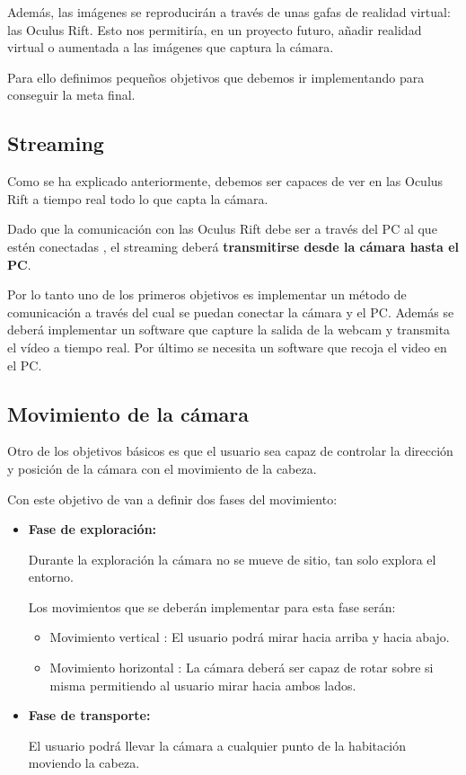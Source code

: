 \documentclass[twoside, 12pt]{epstfg}
\begin{document}
Además, las imágenes se reproducirán a través de unas gafas de realidad virtual: las Oculus Rift. Esto nos permitiría, en un proyecto futuro, añadir realidad virtual o aumentada a las imágenes que captura la cámara.

Para ello definimos pequeños objetivos que debemos ir implementando para conseguir la meta final.

\subsection{Streaming}
Como se ha explicado anteriormente, debemos ser capaces de ver en las Oculus Rift a tiempo real todo lo que capta la cámara.

Dado que la comunicación con las Oculus Rift debe ser a través del PC al que estén conectadas , el streaming deberá \textbf{transmitirse desde la cámara hasta el PC}.

Por lo tanto uno de los primeros objetivos es implementar un método de comunicación a través del cual se puedan conectar  la cámara y el PC. Además se deberá implementar un software que capture la salida de la webcam y transmita el vídeo a tiempo real. Por último se necesita un software que recoja el video en el PC.

\subsection{Movimiento de la cámara}
Otro de los objetivos básicos es que el usuario sea capaz de controlar la dirección y posición de la cámara con el movimiento de la cabeza.

Con este objetivo de van a definir dos fases del movimiento:
\begin{itemize}
	\item \textbf{Fase de exploración:}
	
	Durante la exploración la cámara no se mueve de sitio, tan solo explora el entorno.
	
	Los movimientos que se deberán implementar para esta fase serán:
	\begin{itemize}
		\item Movimiento vertical : El usuario podrá mirar hacia arriba y hacia abajo.
		\item Movimiento horizontal : La cámara deberá ser capaz de rotar sobre si misma permitiendo al usuario mirar hacia ambos lados.
	\end{itemize}
	\item \textbf{Fase de transporte:}
	
	El usuario podrá llevar la cámara a cualquier punto de la habitación moviendo la cabeza.
	
\end{itemize}
\end{document}

